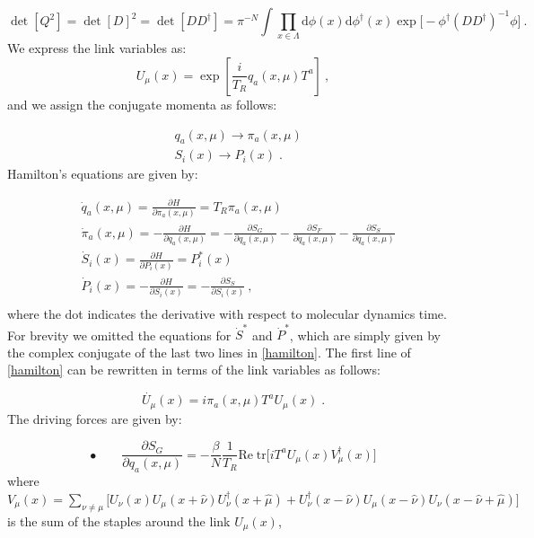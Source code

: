 \begin{equation}
\det[Q^2] = \det[D]^2 = \det[DD^{\dagger}] = \pi^{-N} \int \prod_{x \in \Lambda} \mathrm{d} \phi(x) \mathrm{d} \phi^{\dagger}(x) \exp \bigl[ 
-\phi^{\dagger}(DD^{\dagger})^{-1}  \phi \bigr] \: .
\end{equation}
%
We express the link variables as:
\begin{equation}
U_{\mu}(x)=\exp [\frac{i}{T_R} q_a(x,\mu) T^a] \: , 
\end{equation}
%
and we assign the conjugate momenta as follows:

\begin{equation}
\begin{split}
& q_a(x,\mu) \to \pi_a(x,\mu) \\
& S_i(x) \to P_i(x) \; .
\end{split}
\end{equation}
%
Hamilton's equations are given by:

\begin{equation}
\begin{split}
& \dot{q}_a(x,\mu) = \frac{\partial H}{\partial \pi_a(x,\mu)}  =T_R \pi_a(x,\mu) \\
& \dot{\pi}_a(x,\mu) = -\frac{\partial H}{\partial q_a(x,\mu)} = -\frac{\partial S_G}{\partial q_a(x,\mu)} -\frac{\partial S_F}{\partial q_a(x,\mu)} -\frac{\partial S_S}{\partial q_a(x,\mu)} \\
& \dot{S}_i(x) = \frac{\partial H}{\partial P_i(x)} = P^*_i(x) \\
& \dot{P}_i(x) =  -\frac{\partial H}{\partial S_i(x)} = -\frac{\partial S_S}{\partial S_i(x)}  \: ,\\ 
\end{split} 
\label{hamilton}
\end{equation} 
%
where the dot indicates the derivative with respect to molecular dynamics time. For brevity we omitted the equations for $\dot S^*$ and $\dot P^*$, which are simply given by the complex conjugate of the last two lines in \ref{hamilton}.
The first line of \ref{hamilton} can be rewritten in terms of the link variables as follows:


\begin{equation}
\dot{U_{\mu}}(x)= i \pi_a(x,\mu)T^a U_{\mu}(x) \; .
\end{equation}
%
The driving forces are given by:

\begin{equation}
\bullet \qquad \frac{\partial S_G}{\partial q_a(x,\mu)} = - \frac{\beta}{N} \frac{1}{T_R} \mathrm{Re \; tr} \biggl[ i T^a U_{\mu}(x) V^{\dagger}_{\mu} (x) \biggr]
\end{equation}
%
where $V_{\mu}(x) = \sum_{\nu \neq \mu} \bigl[ U_{\nu}(x) U_{\mu}(x+\hat\nu) U_{\nu}^{\dagger}(x+\hat\mu) + 
U_{\nu}^{\dagger}(x - \hat\nu) U_{\mu}(x - \hat\nu) U_{\nu}(x-\hat\nu+\hat\mu)\bigr]$ is the sum of the staples around the link $U_{\mu}(x)$,


